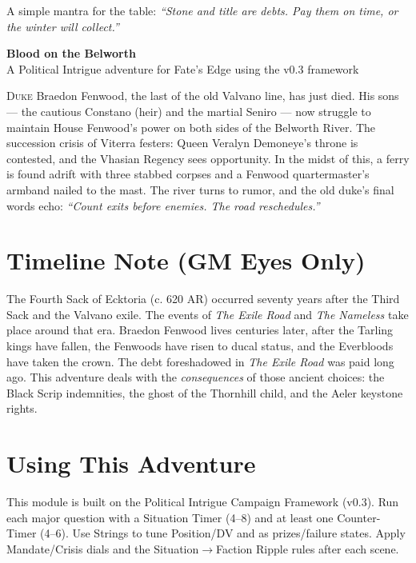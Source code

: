 \documentclass[11pt]{article}
\begin{document}
A simple mantra for the table: \textit{``Stone and title are debts. Pay them on time, or the winter will collect.''}
\clearpage


\begin{center}
    {\Huge \textbf{Blood on the Belworth}} \\
    \vspace{0.5em}
    {\Large A Political Intrigue adventure for Fate's Edge using the v0.3 framework}
\end{center}

\lettrine{D}{uke} Braedon Fenwood, the last of the old Valvano line, has just died. His sons --- the cautious Constano (heir) and the martial Seniro --- now struggle to maintain House Fenwood's power on both sides of the Belworth River. The succession crisis of Viterra festers: Queen Veralyn Demoneye's throne is contested, and the Vhasian Regency sees opportunity. In the midst of this, a ferry is found adrift with three stabbed corpses and a Fenwood quartermaster's armband nailed to the mast. The river turns to rumor, and the old duke's final words echo: \textit{``Count exits before enemies. The road reschedules.''}

\section*{Timeline Note (GM Eyes Only)}
The Fourth Sack of Ecktoria (c. 620 AR) occurred seventy years after the Third Sack and the Valvano exile. The events of \textit{The Exile Road} and \textit{The Nameless} take place around that era. Braedon Fenwood lives centuries later, after the Tarling kings have fallen, the Fenwoods have risen to ducal status, and the Everbloods have taken the crown. The debt foreshadowed in \textit{The Exile Road} was paid long ago. This adventure deals with the \textit{consequences} of those ancient choices: the Black Scrip indemnities, the ghost of the Thornhill child, and the Aeler keystone rights.

\section*{Using This Adventure}
This module is built on the Political Intrigue Campaign Framework (v0.3). Run each major question with a Situation Timer (4--8) and at least one Counter-Timer (4--6). Use Strings to tune Position/DV and as prizes/failure states. Apply Mandate/Crisis dials and the Situation$\rightarrow$Faction Ripple rules after each scene.
\end{document}
